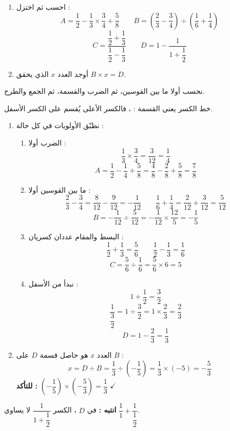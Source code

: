 \documentclass[12pt,a4paper]{article}
\begin{document}
\begin{corr}[title={أولوية العمليات والكسور المركّبة}, stars=3, source={Axiomaths}]
\begin{enumerate}
  \item احسب ثم اختزل :
  \[A=\dfrac{1}{2}-\dfrac{1}{3}\times\dfrac{3}{4}+\dfrac{5}{8}\qquad B=\left(\dfrac{2}{3}-\dfrac{3}{4}\right)\div\left(\dfrac{1}{6}+\dfrac{1}{4}\right)\]
  \[C=\dfrac{\dfrac{1}{2}+\dfrac{1}{3}}{\dfrac{1}{2}-\dfrac{1}{3}}\qquad D=1-\dfrac{1}{1+\dfrac{1}{2}}\]
  \item أوجد العدد $x$ الذي يحقق $B\times x=D$.
\end{enumerate}
\axsol
\begin{prop}
نحسب أولا ما بين القوسين، ثم الضرب والقسمة، ثم الجمع والطرح.
\end{prop}
\begin{prop}[خط الكسر]
خط الكسر يعني القسمة :  ، فالكسر الأعلى يُقسم على الكسر الأسفل.
\end{prop}
\begin{enumerate}[itemsep=14pt]
  \item نطبّق الأولويات في كل حالة :
  \begin{enumerate}[itemsep=12pt]
    \item الضرب أولا :
    \[\dfrac{1}{3}\times\dfrac{3}{4}=\dfrac{3}{12}=\dfrac{1}{4}\]
    \[A=\dfrac{1}{2}-\dfrac{1}{4}+\dfrac{5}{8}=\dfrac{4}{8}-\dfrac{2}{8}+\dfrac{5}{8}=\dfrac{7}{8}\]
    \item ما بين القوسين أولا :
    \[\dfrac{2}{3}-\dfrac{3}{4}=\dfrac{8}{12}-\dfrac{9}{12}=-\dfrac{1}{12}\qquad\dfrac{1}{6}+\dfrac{1}{4}=\dfrac{2}{12}+\dfrac{3}{12}=\dfrac{5}{12}\]
    \[B=-\dfrac{1}{12}\div\dfrac{5}{12}=-\dfrac{1}{12}\times\dfrac{12}{5}=-\dfrac{1}{5}\]
    \item البسط والمقام عددان كسريان :
    \[\dfrac{1}{2}+\dfrac{1}{3}=\dfrac{5}{6}\qquad\dfrac{1}{2}-\dfrac{1}{3}=\dfrac{1}{6}\]
    \[C=\dfrac{5}{6}\div\dfrac{1}{6}=\dfrac{5}{6}\times6=5\]
    \item نبدأ من الأسفل :
    \[1+\dfrac{1}{2}=\dfrac{3}{2}\]
    \[\dfrac{1}{\dfrac{3}{2}}=1\div\dfrac{3}{2}=1\times\dfrac{2}{3}=\dfrac{2}{3}\]
    \[D=1-\dfrac{2}{3}=\dfrac{1}{3}\]
  \end{enumerate}
  \item العدد $x$ هو حاصل قسمة $D$ على $B$ :
  \[x=D\div B=\dfrac{1}{3}\div\left(-\dfrac{1}{5}\right)=\dfrac{1}{3}\times(-5)=-\dfrac{5}{3}\]
  \textbf{للتأكد :} $\left(-\dfrac{1}{5}\right)\times\left(-\dfrac{5}{3}\right)=\dfrac{1}{3}$ $\checkmark$
\end{enumerate}
\textbf{انتبه :} في $D$ ، الكسر $\dfrac{1}{1+\dfrac12}$ لا يساوي $\dfrac{1}{1}+\dfrac{1}{\dfrac12}$.
\end{corr}
\end{document}

